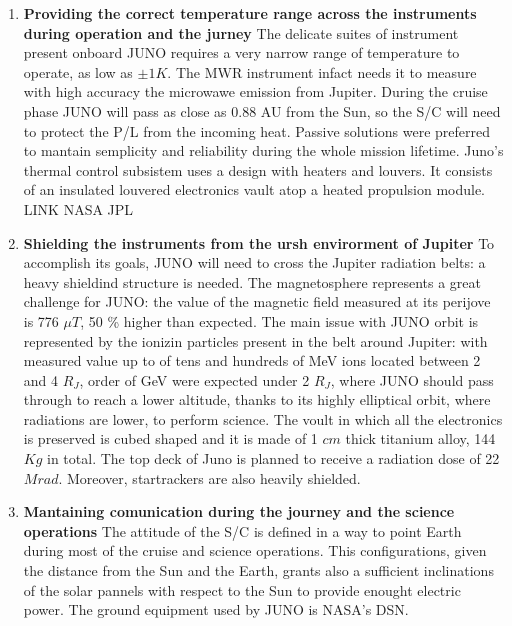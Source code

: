 \begin{enumerate}[leftmargin=1.5em]
    \item \textbf{Providing the correct temperature range across the instruments during operation and the jurney}
    \newline The delicate suites of instrument present onboard JUNO requires a very narrow range of temperature to operate, as 
    low as $\pm 1 K$. The MWR instrument infact needs it to measure with high accuracy the microwawe emission from Jupiter. During the cruise phase JUNO will pass as close as 0.88 AU from the Sun, so the S/C will need to protect the P/L from the incoming heat. Passive solutions were preferred to mantain semplicity and reliability during the whole mission lifetime. Juno's thermal control subsistem uses a design with heaters and louvers. It consists of an insulated louvered electronics vault atop a heated propulsion module. 
    LINK NASA JPL 
    \item \textbf{Shielding the instruments from the ursh envirorment of Jupiter}
    \newline To accomplish its goals, JUNO will need to cross the Jupiter radiation belts: a heavy shieldind structure is needed. The magnetosphere represents a great challenge for JUNO: the value of the magnetic field measured at its perijove is 776 $\mu T$, 50 \% higher than expected. The main issue with JUNO orbit is represented by the ionizin particles present in the belt around Jupiter: with measured value up to of tens and hundreds of MeV ions located between 2 and 4 $R_{J}$, order of GeV were expected under 2 $R_{J}$, where JUNO should pass through to reach a lower altitude, thanks to its highly elliptical orbit, where radiations are lower, to perform science. The voult in which all the electronics is preserved is cubed shaped and it is made of 1 $cm$ thick titanium alloy, 144 $Kg$ in total. The top deck of Juno is planned to receive a radiation dose of 22 $Mrad$. Moreover, startrackers are also heavily shielded. %
    \item \textbf{Mantaining comunication during the journey and the science operations}
    \newline %
    The attitude of the S/C is defined in a way to point Earth during most of the cruise and science operations. This configurations, given the distance from the Sun and the Earth, grants also a sufficient inclinations of the solar pannels with respect to the Sun to provide enought electric power. The ground equipment used by JUNO is NASA's DSN.  
\end{enumerate}  